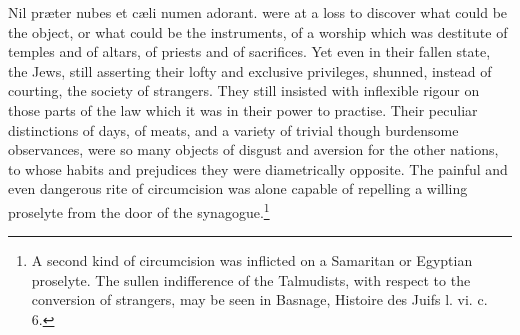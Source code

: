 {Nil præter nubes et cæli numen adorant.} were at a loss to discover what could be the object, or what could be the instruments, of a worship which was destitute of temples and of altars, of priests and of sacrifices. Yet even in their fallen state, the Jews, still asserting their lofty and exclusive privileges, shunned, instead of courting, the society of strangers. They still insisted with inflexible rigour on those parts of the law which it was in their power to practise. Their peculiar distinctions of days, of meats, and a variety of trivial though burdensome observances, were so many objects of disgust and aversion for the other nations, to whose habits and prejudices they were diametrically opposite. The painful and even dangerous rite of circumcision was alone capable of repelling a willing proselyte from the door of the synagogue.\footnote{A second kind of circumcision was inflicted on a Samaritan or Egyptian proselyte. The sullen indifference of the Talmudists, with respect to the conversion of strangers, may be seen in Basnage, Histoire des Juifs l. vi. c. 6.}


